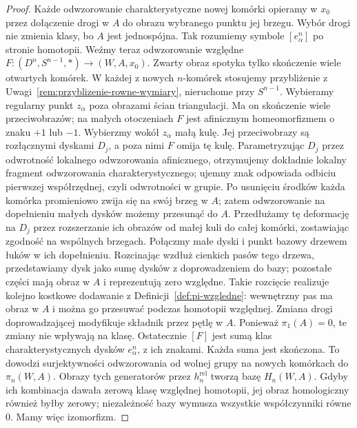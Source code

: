 \begin{proof}
Każde odwzorowanie charakterystyczne nowej komórki opieramy w $x_0$
przez dołączenie drogi w $A$ do obrazu wybranego punktu jej brzegu.
Wybór drogi nie zmienia klasy, bo $A$ jest jednospójna.
Tak rozumiemy symbole $[e_\alpha^n]$ po stronie homotopii.
Weźmy teraz odwzorowanie względne
$F:(D^n,S^{n-1},*)\to(W,A,x_0)$.
Zwarty obraz spotyka
tylko skończenie wiele
otwartych komórek.
W każdej z nowych $n$-komórek stosujemy przybliżenie
z Uwagi~\ref{rem:przyblizenie-rowne-wymiary}, nieruchome przy $S^{n-1}$.
Wybieramy regularny punkt $z_\alpha$ poza obrazami ścian triangulacji.
Ma on skończenie wiele przeciwobrazów; na małych otoczeniach
$F$ jest afinicznym homeomorfizmem o znaku $+1$ lub $-1$.
Wybierzmy wokół $z_\alpha$ małą kulę. Jej przeciwobrazy są rozłącznymi
dyskami $D_j$, a poza nimi $F$ omija tę kulę.
Parametryzując $D_j$ przez odwrotność lokalnego odwzorowania afinicznego,
otrzymujemy dokładnie lokalny fragment odwzorowania charakterystycznego;
ujemny znak odpowiada odbiciu pierwszej współrzędnej, czyli odwrotności w grupie. Po usunięciu
środków każda komórka
promieniowo zwija się
na swój brzeg w $A$;
zatem odwzorowanie na dopełnieniu
małych dysków możemy
przesunąć do $A$.
Przedłużamy tę deformację na $D_j$ przez rozszerzanie ich obrazów
od małej kuli do całej komórki, zostawiając zgodność na wspólnych brzegach.
Połączmy małe dyski i punkt bazowy drzewem łuków w ich dopełnieniu.
Rozcinając wzdłuż cienkich pasów tego drzewa, przedstawiamy dysk
jako sumę dysków z doprowadzeniem do bazy; pozostałe części mają obraz w $A$
i reprezentują zero względne. Takie rozcięcie realizuje kolejno
kostkowe dodawanie z Definicji~\ref{def:pi-wzgledne}:
wewnętrzny pas ma obraz w $A$ i można go przesuwać podczas homotopii względnej.
Zmiana drogi doprowadzającej modyfikuje składnik przez pętlę w $A$.
Ponieważ $\pi_1(A)=0$, te zmiany nie wpływają na klasę.
Ostatecznie $[F]$ jest sumą klas charakterystycznych dysków
$e_\alpha^n$, z ich znakami. Każda suma jest skończona.
To dowodzi surjektywności
odwzorowania od wolnej grupy
na nowych komórkach
do $\pi_n(W,A)$.
Obrazy tych generatorów
przez $h_n^{\mathrm{rel}}$
tworzą bazę
$H_n(W,A)$. Gdyby ich
kombinacja dawała
zerową klasę względnej
homotopii, jej obraz
homologiczny również
byłby zerowy; niezależność
bazy wymusza wszystkie
współczynniki równe $0$.
Mamy więc izomorfizm.


\end{proof}
